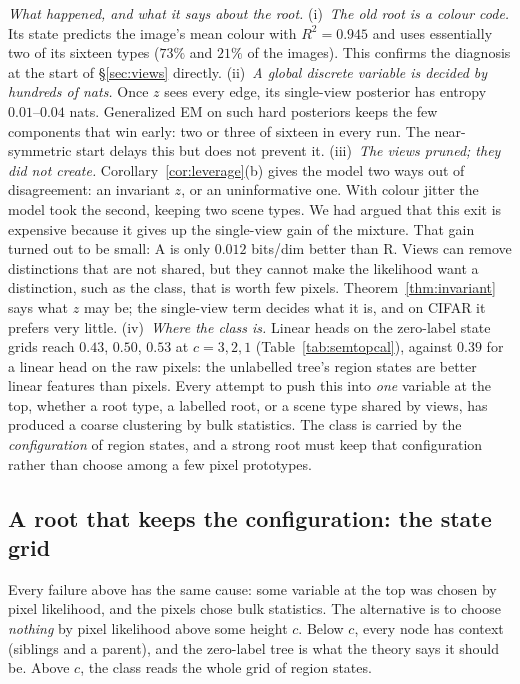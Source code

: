 \documentclass[11pt]{article}
\theoremstyle{definition}
\begin{document}
\emph{What happened, and what it says about the root.}
(i)~\emph{The old root is a colour code.} Its state predicts the image's mean colour with $R^2=0.945$ and uses essentially
two of its sixteen types ($73\%$ and $21\%$ of the images). This confirms the diagnosis at the start of \S\ref{sec:views}
directly.
(ii)~\emph{A global discrete variable is decided by hundreds of nats.} Once $z$ sees every edge, its single-view posterior
has entropy $0.01$--$0.04$ nats. Generalized EM on such hard posteriors keeps the few components that win early: two or
three of sixteen in every run. The near-symmetric start delays this but does not prevent it.
(iii)~\emph{The views pruned; they did not create.} Corollary~\ref{cor:leverage}(b) gives the model two ways out of
disagreement: an invariant $z$, or an uninformative one. With colour jitter the model took the second, keeping two scene
types. We had argued that this exit is expensive because it gives up the single-view gain of the mixture. That gain turned
out to be small: A is only $0.012$ bits/dim better than R. Views can remove distinctions that are not shared, but they
cannot make the likelihood want a distinction, such as the class, that is worth few pixels. Theorem~\ref{thm:invariant} says
what $z$ may be; the single-view term decides what it is, and on CIFAR it prefers very little.
(iv)~\emph{Where the class is.} Linear heads on the zero-label state grids reach $0.43$, $0.50$, $0.53$ at $c=3,2,1$
(Table~\ref{tab:semtopcal}), against $0.39$ for a linear head on the raw pixels: the unlabelled tree's region states are
better linear features than pixels. Every attempt to push this into \emph{one} variable at the top, whether a root type, a
labelled root, or a scene type shared by views, has produced a coarse clustering by bulk statistics. The class is carried by
the \emph{configuration} of region states, and a strong root must keep that configuration rather than choose among a few
pixel prototypes.

\subsection{A root that keeps the configuration: the state grid}\label{sec:grid}
Every failure above has the same cause: some variable at the top was chosen by pixel likelihood, and the pixels chose
bulk statistics. The alternative is to choose \emph{nothing} by pixel likelihood above some height $c$. Below $c$, every
node has context (siblings and a parent), and the zero-label tree is what the theory says it should be. Above $c$, the
class reads the whole grid of region states.
\end{document}
